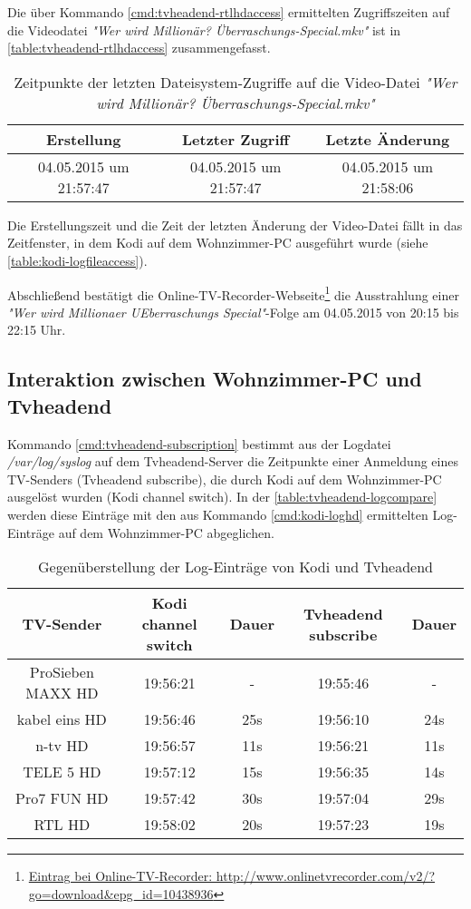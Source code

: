 Die über Kommando \autoref{cmd:tvheadend-rtlhdaccess} ermittelten Zugriffszeiten auf die Videodatei \textit{"Wer wird Millionär? Überraschungs-Special.mkv"} ist in \autoref{table:tvheadend-rtlhdaccess} zusammengefasst.

\begin{table}[H]
\begin{tabular}{ccc}
\toprule
Erstellung & Letzter Zugriff & Letzte Änderung \\ 
\midrule
04.05.2015 um 21:57:47 & 04.05.2015 um 21:57:47 & 04.05.2015 um 21:58:06 \\ 
\bottomrule
\end{tabular}
\caption{Zeitpunkte der letzten Dateisystem-Zugriffe auf die Video-Datei \textit{"Wer wird Millionär? Überraschungs-Special.mkv"}}
\label{table:tvheadend-rtlhdaccess}
\end{table}

Die Erstellungszeit und die Zeit der letzten Änderung der Video-Datei fällt in das Zeitfenster, in dem Kodi auf dem Wohnzimmer-PC ausgeführt wurde (siehe \autoref{table:kodi-logfileaccess}).

Abschließend bestätigt die Online-TV-Recorder-Webseite\footnote{\href{http://www.onlinetvrecorder.com/v2/?go=download\&epg\_id=10438936}{Eintrag bei Online-TV-Recorder: http://www.onlinetvrecorder.com/v2/?go=download\&epg\_id=10438936}} die Ausstrahlung einer \textit{"Wer wird Millionaer UEberraschungs Special"}-Folge am 04.05.2015 von 20:15 bis 22:15 Uhr.

\subsection{Interaktion zwischen Wohnzimmer-PC und Tvheadend}

Kommando \autoref{cmd:tvheadend-subscription} bestimmt aus der Logdatei \textit{/var/log/syslog} auf dem Tvheadend-Server die Zeitpunkte einer Anmeldung eines TV-Senders (Tvheadend subscribe), die durch Kodi auf dem Wohnzimmer-PC ausgelöst wurden (Kodi channel switch). In der \autoref{table:tvheadend-logcompare} werden diese Einträge mit den aus Kommando \autoref{cmd:kodi-loghd} ermittelten Log-Einträge auf dem Wohnzimmer-PC abgeglichen.

\begin{table}[H]
\begin{tabular}{ccccc}
\toprule
TV-Sender & Kodi channel switch & Dauer & Tvheadend subscribe & Dauer \\ 
\midrule
ProSieben MAXX HD & 19:56:21 & - & 19:55:46 & - \\ 
kabel eins HD & 19:56:46 & 25s & 19:56:10 & 24s \\ 
n-tv HD & 19:56:57 & 11s & 19:56:21 & 11s \\ 
TELE 5 HD & 19:57:12 & 15s & 19:56:35 & 14s \\ 
Pro7 FUN HD & 19:57:42 & 30s & 19:57:04 & 29s \\ 
RTL HD & 19:58:02 & 20s & 19:57:23 & 19s \\ 
\bottomrule
\end{tabular}
\caption{Gegenüberstellung der Log-Einträge von Kodi und Tvheadend}
\label{table:tvheadend-logcompare}
\end{table}

